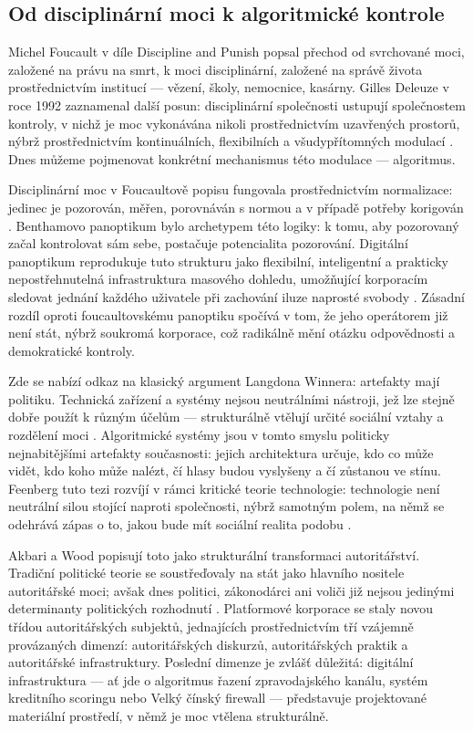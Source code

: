 \subsection{Od disciplinární moci k algoritmické kontrole}

Michel Foucault v díle Discipline and Punish \parencite{Foucault77} popsal přechod od svrchované moci, založené na právu na smrt, k moci disciplinární, založené na správě života prostřednictvím institucí — vězení, školy, nemocnice, kasárny. Gilles Deleuze v roce 1992 zaznamenal další posun: disciplinární společnosti ustupují společnostem kontroly, v nichž je moc vykonávána nikoli prostřednictvím uzavřených prostorů, nýbrž prostřednictvím kontinuálních, flexibilních a všudypřítomných modulací \parencite{Deleuze92}. Dnes můžeme pojmenovat konkrétní mechanismus této modulace — algoritmus.

Disciplinární moc v Foucaultově popisu fungovala prostřednictvím normalizace: jedinec je pozorován, měřen, porovnáván s normou a v případě potřeby korigován \parencite{Foucault77}. Benthamovo panoptikum bylo archetypem této logiky: k tomu, aby pozorovaný začal kontrolovat sám sebe, postačuje potencialita pozorování. Digitální panoptikum reprodukuje tuto strukturu jako flexibilní, inteligentní a prakticky nepostřehnutelná infrastruktura masového dohledu, umožňující korporacím sledovat jednání každého uživatele při zachování iluze naprosté svobody \parencite{SauraGarcia24}. Zásadní rozdíl oproti foucaultovskému panoptiku spočívá v tom, že jeho operátorem již není stát, nýbrž soukromá korporace, což radikálně mění otázku odpovědnosti a demokratické kontroly.

Zde se nabízí odkaz na klasický argument Langdona Winnera: artefakty mají politiku.
Technická zařízení a systémy nejsou neutrálními nástroji, jež lze stejně dobře použít k různým účelům — strukturálně vtělují určité sociální vztahy a rozdělení moci \parencite{Winner86}.
Algoritmické systémy jsou v tomto smyslu politicky nejnabitějšími artefakty současnosti: jejich architektura určuje, kdo co může vidět, kdo koho může nalézt, čí hlasy budou vyslyšeny a čí zůstanou ve stínu.
Feenberg tuto tezi rozvíjí v rámci kritické teorie technologie: technologie není neutrální silou stojící naproti společnosti, nýbrž samotným polem, na němž se odehrává zápas o to, jakou bude mít sociální realita podobu \parencite{Feenberg02}.

Akbari a Wood popisují toto jako strukturální transformaci autoritářství.
Tradiční politické teorie se soustřeďovaly na stát jako hlavního nositele autoritářské moci; avšak dnes politici, zákonodárci ani voliči již nejsou jedinými determinanty politických rozhodnutí \parencite{AkbariWood25}. Platformové korporace se staly novou třídou autoritářských subjektů, jednajících prostřednictvím tří vzájemně provázaných dimenzí: autoritářských diskurzů, autoritářských praktik a autoritářské infrastruktury. Poslední dimenze je zvlášť důležitá: digitální infrastruktura — ať jde o algoritmus řazení zpravodajského kanálu, systém kreditního scoringu nebo Velký čínský firewall — představuje projektované materiální prostředí, v němž je moc vtělena strukturálně.

